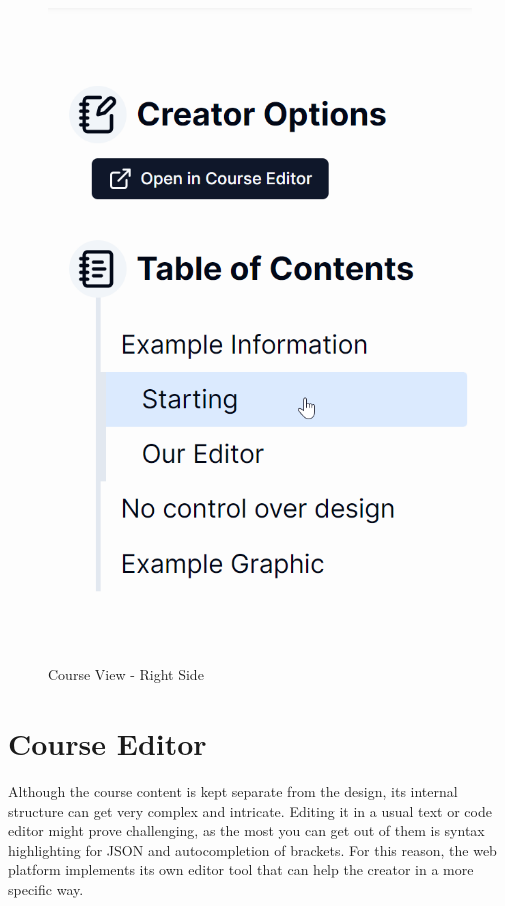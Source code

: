 \begin{figure}[h]
    \centering
    \includegraphics[scale=0.7]{images/table-of-contents.png}
    \caption{Course View - Right Side}
    \label{fig:course-table-of-contents}
\end{figure}

\section{Course Editor}

Although the course content is kept separate from the design, its internal structure can get very complex and intricate. Editing it in a usual text or code editor might prove challenging, as the most you can get out of them is syntax highlighting for JSON and autocompletion of brackets. For this reason, the web platform implements its own editor tool that can help the creator in a more specific way.

